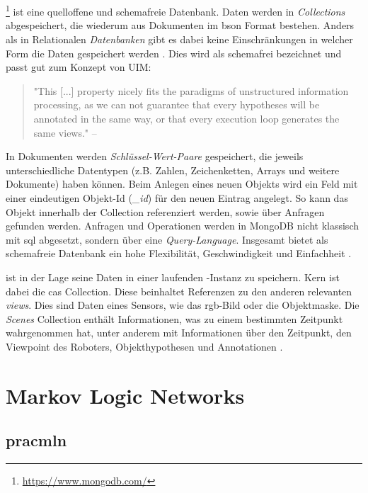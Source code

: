 \section{\mongodb}
\label{sec:mongodb}
\mongodb\footnote{\url{https://www.mongodb.com/}} ist eine quelloffene und schemafreie Datenbank. Daten werden in \textit{Collections} abgespeichert, die wiederum aus Dokumenten im \gls{bson} Format bestehen. Anders als in Relationalen \textit{Datenbanken} gibt es dabei keine Einschränkungen in welcher Form die Daten gespeichert werden \cite{mongoVsOracle}. Dies wird als schemafrei bezeichnet und passt gut zum Konzept von UIM:
\begin{quote}
"This [...] property nicely fits the paradigms of unstructured information processing, as we can not guarantee that every hypotheses will be annotated in the same way, or that every execution loop generates the same views." \hfill -- \cite{episodicMemory}
\end{quote}
In Dokumenten werden \textit{Schlüssel-Wert-Paare} gespeichert, die jeweils unterschiedliche Datentypen (z.B. Zahlen, Zeichenketten, Arrays und weitere Dokumente) haben können. Beim Anlegen eines neuen Objekts wird ein Feld mit einer eindeutigen Objekt-Id (\textit{\_id}) für den neuen Eintrag angelegt. So kann das Objekt innerhalb der Collection referenziert werden, sowie über Anfragen gefunden werden. Anfragen und Operationen werden in MongoDB nicht klassisch mit \gls{sql} abgesetzt, sondern über eine \textit{Query-Language}. Insgesamt bietet \mongodb als schemafreie Datenbank ein hohe Flexibilität, Geschwindigkeit und Einfachheit \cite{mongoVsOracle}.  \par 
\robosherlock ist in der Lage seine Daten in einer laufenden \mongodb-Instanz zu speichern. Kern ist dabei die \gls{cas} Collection. Diese beinhaltet Referenzen zu den anderen relevanten \textit{views}. Dies sind Daten eines Sensors, wie das \gls{rgb}-Bild oder die Objektmaske. Die \textit{Scenes} Collection enthält Informationen, was \robosherlock zu einem bestimmten Zeitpunkt wahrgenommen hat, unter anderem mit Informationen über den Zeitpunkt, den Viewpoint des Roboters, Objekthypothesen und Annotationen \cite{episodicMemory}.  



\section{Markov Logic Networks}
\label{sec:mln}

\subsection{pracmln}
\label{subsec:pracmln}
